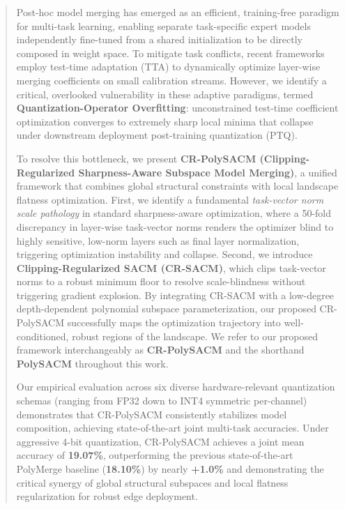 \begin{abstract}
Post-hoc model merging has emerged as an efficient, training-free paradigm for multi-task learning, enabling separate task-specific expert models independently fine-tuned from a shared initialization to be directly composed in weight space. To mitigate task conflicts, recent frameworks employ test-time adaptation (TTA) to dynamically optimize layer-wise merging coefficients on small calibration streams. However, we identify a critical, overlooked vulnerability in these adaptive paradigms, termed \textbf{Quantization-Operator Overfitting}: unconstrained test-time coefficient optimization converges to extremely sharp local minima that collapse under downstream deployment post-training quantization (PTQ). 

To resolve this bottleneck, we present \textbf{CR-PolySACM (Clipping-Regularized Sharpness-Aware Subspace Model Merging)}, a unified framework that combines global structural constraints with local landscape flatness optimization. First, we identify a fundamental \emph{task-vector norm scale pathology} in standard sharpness-aware optimization, where a 50-fold discrepancy in layer-wise task-vector norms renders the optimizer blind to highly sensitive, low-norm layers such as final layer normalization, triggering optimization instability and collapse. Second, we introduce \textbf{Clipping-Regularized SACM (CR-SACM)}, which clips task-vector norms to a robust minimum floor to resolve scale-blindness without triggering gradient explosion. By integrating CR-SACM with a low-degree depth-dependent polynomial subspace parameterization, our proposed CR-PolySACM successfully maps the optimization trajectory into well-conditioned, robust regions of the landscape. We refer to our proposed framework interchangeably as \textbf{CR-PolySACM} and the shorthand \textbf{PolySACM} throughout this work. 

Our empirical evaluation across six diverse hardware-relevant quantization schemas (ranging from FP32 down to INT4 symmetric per-channel) demonstrates that CR-PolySACM consistently stabilizes model composition, achieving state-of-the-art joint multi-task accuracies. Under aggressive 4-bit quantization, CR-PolySACM achieves a joint mean accuracy of \textbf{19.07\%}, outperforming the previous state-of-the-art PolyMerge baseline (\textbf{18.10\%}) by nearly \textbf{+1.0\%} and demonstrating the critical synergy of global structural subspaces and local flatness regularization for robust edge deployment.
\end{abstract}
